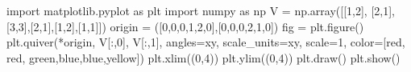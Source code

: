 \documentclass[
  letterpaper,
  DIV=11,
  numbers=noendperiod]{scrartcl}
\newenvironment{Shaded}{\begin{snugshade}}{\end{snugshade}}
\newcommand{\DecValTok}[1]{\textcolor[rgb]{0.68,0.00,0.00}{#1}}
\newcommand{\ImportTok}[1]{\textcolor[rgb]{0.00,0.46,0.62}{#1}}
\newcommand{\NormalTok}[1]{\textcolor[rgb]{0.00,0.23,0.31}{#1}}
\newcommand{\OperatorTok}[1]{\textcolor[rgb]{0.37,0.37,0.37}{#1}}
\newcommand{\StringTok}[1]{\textcolor[rgb]{0.13,0.47,0.30}{#1}}
\begin{document}
\begin{Shaded}
\begin{Highlighting}[]
\ImportTok{import}\NormalTok{ matplotlib.pyplot }\ImportTok{as}\NormalTok{ plt}
\ImportTok{import}\NormalTok{ numpy }\ImportTok{as}\NormalTok{ np}
\NormalTok{V }\OperatorTok{=}\NormalTok{ np.array([[}\DecValTok{1}\NormalTok{,}\DecValTok{2}\NormalTok{], [}\DecValTok{2}\NormalTok{,}\DecValTok{1}\NormalTok{], [}\DecValTok{3}\NormalTok{,}\DecValTok{3}\NormalTok{],[}\DecValTok{2}\NormalTok{,}\DecValTok{1}\NormalTok{],[}\DecValTok{1}\NormalTok{,}\DecValTok{2}\NormalTok{],[}\DecValTok{1}\NormalTok{,}\DecValTok{1}\NormalTok{]])}
\NormalTok{origin }\OperatorTok{=}\NormalTok{ ([}\DecValTok{0}\NormalTok{,}\DecValTok{0}\NormalTok{,}\DecValTok{0}\NormalTok{,}\DecValTok{1}\NormalTok{,}\DecValTok{2}\NormalTok{,}\DecValTok{0}\NormalTok{],[}\DecValTok{0}\NormalTok{,}\DecValTok{0}\NormalTok{,}\DecValTok{0}\NormalTok{,}\DecValTok{2}\NormalTok{,}\DecValTok{1}\NormalTok{,}\DecValTok{0}\NormalTok{])}
\NormalTok{fig }\OperatorTok{=}\NormalTok{ plt.figure()}
\NormalTok{plt.quiver(}\OperatorTok{*}\NormalTok{origin, V[:,}\DecValTok{0}\NormalTok{], V[:,}\DecValTok{1}\NormalTok{], angles}\OperatorTok{=}\StringTok{\textquotesingle{}xy\textquotesingle{}}\NormalTok{, scale\_units}\OperatorTok{=}\StringTok{\textquotesingle{}xy\textquotesingle{}}\NormalTok{, scale}\OperatorTok{=}\DecValTok{1}\NormalTok{, color}\OperatorTok{=}\NormalTok{[}\StringTok{\textquotesingle{}red\textquotesingle{}}\NormalTok{, }\StringTok{\textquotesingle{}red\textquotesingle{}}\NormalTok{, }\StringTok{\textquotesingle{}green\textquotesingle{}}\NormalTok{,}\StringTok{\textquotesingle{}blue\textquotesingle{}}\NormalTok{,}\StringTok{\textquotesingle{}blue\textquotesingle{}}\NormalTok{,}\StringTok{\textquotesingle{}yellow\textquotesingle{}}\NormalTok{])}
\NormalTok{plt.xlim((}\DecValTok{0}\NormalTok{,}\DecValTok{4}\NormalTok{))}
\NormalTok{plt.ylim((}\DecValTok{0}\NormalTok{,}\DecValTok{4}\NormalTok{)) }
\NormalTok{plt.draw()}
\NormalTok{plt.show()}
\end{Highlighting}
\end{Shaded}
\end{document}
